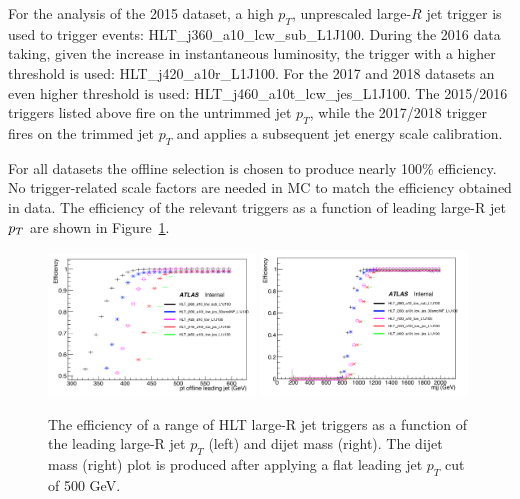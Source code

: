For the analysis of the 2015 dataset, a high $p_T$, unprescaled large-$R$ jet trigger is used to trigger events: HLT\_j360\_a10\_lcw\_sub\_L1J100. During the 2016 data taking, given the increase in instantaneous luminosity, the trigger with a higher threshold is used: HLT\_j420\_a10r\_L1J100. For the 2017 and 2018 datasets an even higher threshold is used: HLT\_j460\_a10t\_lcw\_jes\_L1J100. The 2015/2016 triggers listed above fire on the untrimmed jet $p_T$, while the 2017/2018 trigger fires on the trimmed jet $p_T$ and applies a subsequent jet energy scale calibration.

For all datasets the offline selection is chosen to produce nearly 100\% efficiency. No trigger-related scale factors are needed in MC to match the efficiency obtained in data.
The efficiency of the relevant triggers as a function of leading large-R jet $p_{T}$ are shown in Figure~\ref{fig:trigeffturnon}.

\begin{figure}[htbp!]
\begin{center}
\includegraphics[width=0.49\textwidth]{trigger_eff_vs_pt.png}
\includegraphics[width=0.49\textwidth]{trigger_eff_vs_mjj.png}
\end{center}
\caption{
    The efficiency of a range of HLT large-R jet triggers as a function of the leading large-R jet $p_T$ (left) and dijet mass (right).
    The dijet mass (right) plot is produced after applying a flat leading jet $p_T$ cut of 500 GeV.
}
\label{fig:trigeffturnon}
\end{figure}

